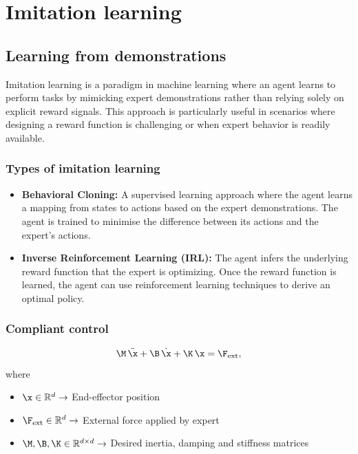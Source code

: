 
\part{Imitation learning}

\chapter{Learning from demonstrations}

Imitation learning is a paradigm in machine learning where an agent learns to perform tasks by mimicking expert demonstrations rather than relying solely on explicit reward signals.
This approach is particularly useful in scenarios where designing a reward function is challenging or when expert behavior is readily available.

\section{Types of imitation learning}

\begin{itemize}
    \item \textbf{Behavioral Cloning:} A supervised learning approach where the agent learns a mapping from states to actions based on the expert demonstrations.
        The agent is trained to minimise the difference between its actions and the expert's actions.

    \item \textbf{Inverse Reinforcement Learning (IRL):} The agent infers the underlying reward function that the expert is optimizing.
        Once the reward function is learned, the agent can use reinforcement learning techniques to derive an optimal policy.
\end{itemize}

\section{Compliant control}

\begin{equation*}
    \M \, \ddot\x + \B \, \dot\x + \K \, \x = \F_{\text{ext}},
\end{equation*}
where
\begin{itemize}
    \item
        \( \x \in \mathbb{R}^d \to \)
        End-effector position

    \item
        \( \F_{\text{ext}} \in \mathbb{R}^d \to \)
        External force applied by expert

    \item
        \( \M, \B, \K \in \mathbb{R}^{d \times d} \to \)
        Desired inertia, damping and stiffness matrices
\end{itemize}
